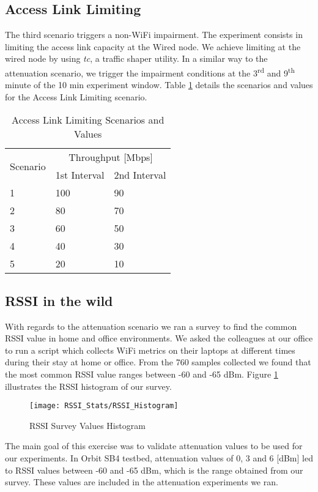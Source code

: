 \subsection*{Access Link Limiting}

The third scenario triggers a non-WiFi impairment. The experiment consists in limiting the access link capacity at the Wired node. We achieve limiting at the wired node by using \emph{tc}, a traffic shaper utility. In a similar way to the attenuation scenario, we trigger the impairment conditions at the 3\textsuperscript{rd} and 9\textsuperscript{th} minute of the 10 min experiment window. Table \ref{table:Access_Link_Experiment_Values} details the scenarios and values for the Access Link Limiting scenario.

\begin{table}[h!]
	\begin{center}
		\begin{tabular}{|| m{5em} | m{2cm}| m{2cm} ||}
			\hline
			\multirow{2}{*}{Scenario} & \multicolumn{2}{c||}{Throughput {[}Mbps{]}} \\ \cline{2-3} 
			& \multicolumn{1}{l|}{1st Interval} & \multicolumn{1}{l||}{2nd Interval} \\ \hline\hline
			1 & 100 & 90 \\ \hline
			2 & 80 & 70 \\ \hline
			3 & 60 & 50 \\ \hline
			4 & 40 & 30 \\ \hline
			5 & 20 & 10 \\ \hline
		\end{tabular}
	\end{center}
	\caption{Access Link Limiting Scenarios and Values}
	\label{table:Access_Link_Experiment_Values}
\end{table}

\subsection{RSSI in the wild}

With regards to the attenuation scenario we ran a survey to find the common RSSI value in home and office environments. We asked the colleagues at our office to run a script which collects WiFi metrics on their laptops at different times during their stay at home or office. From the 760 samples collected we found that the most common RSSI value ranges between -60 and -65 dBm. Figure \ref{fig:RSSI_Histogram} illustrates the RSSI histogram of our survey.

\begin{figure}[h]
	\centering
	\texttt{[image: RSSI\_Stats/RSSI\_Histogram]}
	\caption{RSSI Survey Values Histogram}
	\label{fig:RSSI_Histogram}
\end{figure}

The main goal of this exercise was to validate attenuation values to be used for our experiments. In Orbit SB4 testbed, attenuation values of 0, 3 and 6 [dBm] led to RSSI values between -60 and -65 dBm, which is the range obtained from our survey. These values are included in the attenuation experiments we ran.



